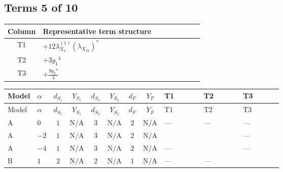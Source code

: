 \documentclass[8pt]{article}
\begin{document}
\begin{landscape}
\subsection*{Terms 5 of 10}
\begin{center}
\begin{tabular}{@{}c >{\raggedright\arraybackslash}p{0.82\linewidth}@{}}
\toprule
Column & Representative term structure \\
\midrule
T1 & \(\displaystyle +12 {\lambda_{X_{7}}^{(1)}} \left({\lambda_{X_{16}}}\right)^{*}\) \\
\midrule
T2 & \(\displaystyle +3 {g_1}^4\) \\
\midrule
T3 & \(\displaystyle +\frac{9 {g_2}^4}{4}\) \\
\midrule
\bottomrule
\end{tabular}
\end{center}
\smallskip
\tiny
\begin{longtable}{@{}llcccccc >{\raggedright\arraybackslash}p{0.21\linewidth} >{\raggedright\arraybackslash}p{0.21\linewidth} >{\raggedright\arraybackslash}p{0.21\linewidth}@{}}
\toprule
Model & $\alpha$ & $d_{S_1}$ & $Y_{S_1}$ & $d_{S_2}$ & $Y_{S_2}$ & $d_F$ & $Y_F$ & T1 & T2 & T3 \\
\midrule
\endfirsthead
\toprule
Model & $\alpha$ & $d_{S_1}$ & $Y_{S_1}$ & $d_{S_2}$ & $Y_{S_2}$ & $d_F$ & $Y_F$ & T1 & T2 & T3 \\
\midrule
\endhead
A & $0$ & $1$ & $\text{N/A}$ & $3$ & $\text{N/A}$ & $2$ & $\text{N/A}$ & --- & --- & --- \\
\midrule
A & $-2$ & $1$ & $\text{N/A}$ & $3$ & $\text{N/A}$ & $2$ & $\text{N/A}$ & \scriptsize\adjustbox{max width=\linewidth}{$\begin{gathered} +12 {\lambda_{X_{7}}^{(1)}} \left({\lambda_{X_{16}}}\right)^{*}\end{gathered}$} & \scriptsize\adjustbox{max width=\linewidth}{$\begin{gathered} +3 {g_1}^4\end{gathered}$} & --- \\
\midrule
A & $-4$ & $1$ & $\text{N/A}$ & $3$ & $\text{N/A}$ & $2$ & $\text{N/A}$ & --- & \scriptsize\adjustbox{max width=\linewidth}{$\begin{gathered} +12 {g_1}^4\end{gathered}$} & --- \\
\midrule
B & $1$ & $2$ & $\text{N/A}$ & $2$ & $\text{N/A}$ & $1$ & $\text{N/A}$ & --- & --- & \scriptsize\adjustbox{max width=\linewidth}{$\begin{gathered} +\frac{9 {g_2}^4}{4}\end{gathered}$} \\

\end{longtable}
\end{landscape}
\end{document}
